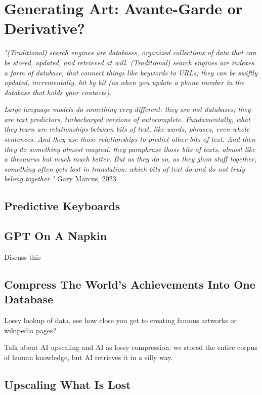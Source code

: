 \setchapterpreamble[u]{\margintoc}
\chapter{Generating Art: Avante-Garde or Derivative?}

\textit{"(Traditional) search engines are databases, organized collections of data that can be stored, updated, and retrieved at will. (Traditional) search engines are indexes. a form of database, that connect things like keywords to URLs; they can be swiftly updated, incrementally, bit by bit (as when you update a phone number in the database that holds your contacts).}

\textit{Large language models do something very different: they are not databases; they are text predictors, turbocharged versions of autocomplete. Fundamentally, what they learn are relationships between bits of text, like words, phrases, even whole sentences. And they use those relationships to predict other bits of text. And then they do something almost magical: they paraphrase those bits of texts, almost like a thesaurus but much much better. But as they do so, as they glom stuff together, something often gets lost in translation: which bits of text do and do not truly belong together."} Gary Marcus, 2023 \cite{marcus_2023}

\section{Predictive Keyboards}

\section{GPT On A Napkin}

Discuss this 

\section{Compress The World's Achievements Into One Database}


Lossy lookup of data, see how close you get to creating famous artworks or wikipedia pages?

Talk about AI upscaling and AI as lossy compression. we stored the entire corpus of human knowledge, but AI retrieves it in a silly way.

\section{Upscaling What Is Lost}

